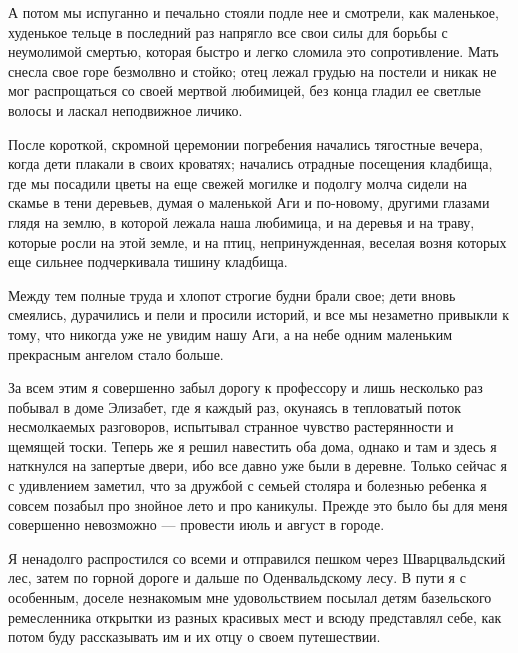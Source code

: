 А  потом мы  испуганно и  печально стояли  подле нее  и смотрели,  как
маленькое, худенькое тельце в последний раз напрягло все свои силы для
борьбы  с  неумолимой смертью,  которая  быстро  и легко  сломила  это
сопротивление. Мать  снесла свое горе  безмолвно и стойко;  отец лежал
грудью  на  постели и  никак  не  мог  распрощаться со  своей  мертвой
любимицей, без  конца гладил  ее светлые  волосы и  ласкал неподвижное
личико.

После  короткой,  скромной  церемонии  погребения  начались  тягостные
вечера,  когда  дети  плакали  в  своих  кроватях;  начались  отрадные
посещения  кладбища, где  мы посадили  цветы на  еще свежей  могилке и
подолгу молча сидели на скамье в  тени деревьев, думая о маленькой Аги
и по-новому,  другими глазами  глядя на землю,  в которой  лежала наша
любимица, и на деревья  и на траву, которые росли на  этой земле, и на
птиц, непринужденная,  веселая возня которых еще  сильнее подчеркивала
тишину кладбища.

Между тем полные  труда и хлопот строгие будни брали  свое; дети вновь
смеялись,  дурачились и  пели и  просили историй,  и все  мы незаметно
привыкли к тому, что  никогда уже не увидим нашу Аги,  а на небе одним
маленьким прекрасным ангелом стало больше.

За  всем  этим   я  совершенно  забыл  дорогу  к   профессору  и  лишь
несколько раз  побывал в доме Элизабет,  где я каждый раз,  окунаясь в
тепловатый поток  несмолкаемых разговоров, испытывал  странное чувство
растерянности и щемящей  тоски. Теперь же я решил  навестить оба дома,
однако и там и здесь я наткнулся  на запертые двери, ибо все давно уже
были в деревне. Только сейчас я с удивлением заметил, что за дружбой с
семьей столяра и болезнью ребенка я  совсем позабыл про знойное лето и
про каникулы.  Прежде это было  бы для меня совершенно  невозможно ---
провести июль и август в городе.

Я  ненадолго   распростился  со   всеми  и  отправился   пешком  через
Шварцвальдский лес, затем по горной  дороге и дальше по Оденвальдскому
лесу.  В  пути я  с  особенным,  доселе незнакомым  мне  удовольствием
посылал  детям базельского  ремесленника открытки  из разных  красивых
мест и  всюду представлял себе,  как потом  буду рассказывать им  и их
отцу о своем путешествии.

